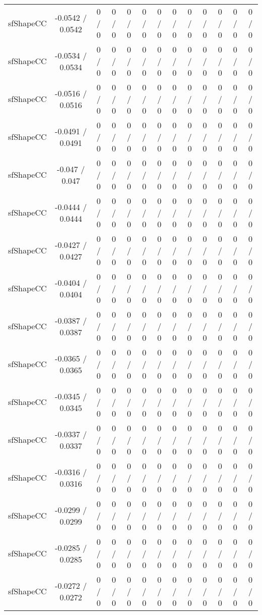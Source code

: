 \documentclass[10pt]{article}
\begin{document}
\begin{table}[htbp]
\begin{center}
\begin{tabular}{|c|c|c|c|c|c|c|c|c|c|c|c|c|}
  sfShapeCC & -0.0542 / 0.0542 & 0 / 0 & 0 / 0 & 0 / 0 & 0 / 0 & 0 / 0 & 0 / 0 & 0 / 0 & 0 / 0 & 0 / 0 & 0 / 0 & 0 / 0 \\ 
  sfShapeCC & -0.0534 / 0.0534 & 0 / 0 & 0 / 0 & 0 / 0 & 0 / 0 & 0 / 0 & 0 / 0 & 0 / 0 & 0 / 0 & 0 / 0 & 0 / 0 & 0 / 0 \\ 
  sfShapeCC & -0.0516 / 0.0516 & 0 / 0 & 0 / 0 & 0 / 0 & 0 / 0 & 0 / 0 & 0 / 0 & 0 / 0 & 0 / 0 & 0 / 0 & 0 / 0 & 0 / 0 \\ 
  sfShapeCC & -0.0491 / 0.0491 & 0 / 0 & 0 / 0 & 0 / 0 & 0 / 0 & 0 / 0 & 0 / 0 & 0 / 0 & 0 / 0 & 0 / 0 & 0 / 0 & 0 / 0 \\ 
  sfShapeCC & -0.047 / 0.047 & 0 / 0 & 0 / 0 & 0 / 0 & 0 / 0 & 0 / 0 & 0 / 0 & 0 / 0 & 0 / 0 & 0 / 0 & 0 / 0 & 0 / 0 \\ 
  sfShapeCC & -0.0444 / 0.0444 & 0 / 0 & 0 / 0 & 0 / 0 & 0 / 0 & 0 / 0 & 0 / 0 & 0 / 0 & 0 / 0 & 0 / 0 & 0 / 0 & 0 / 0 \\ 
  sfShapeCC & -0.0427 / 0.0427 & 0 / 0 & 0 / 0 & 0 / 0 & 0 / 0 & 0 / 0 & 0 / 0 & 0 / 0 & 0 / 0 & 0 / 0 & 0 / 0 & 0 / 0 \\ 
  sfShapeCC & -0.0404 / 0.0404 & 0 / 0 & 0 / 0 & 0 / 0 & 0 / 0 & 0 / 0 & 0 / 0 & 0 / 0 & 0 / 0 & 0 / 0 & 0 / 0 & 0 / 0 \\ 
  sfShapeCC & -0.0387 / 0.0387 & 0 / 0 & 0 / 0 & 0 / 0 & 0 / 0 & 0 / 0 & 0 / 0 & 0 / 0 & 0 / 0 & 0 / 0 & 0 / 0 & 0 / 0 \\ 
  sfShapeCC & -0.0365 / 0.0365 & 0 / 0 & 0 / 0 & 0 / 0 & 0 / 0 & 0 / 0 & 0 / 0 & 0 / 0 & 0 / 0 & 0 / 0 & 0 / 0 & 0 / 0 \\ 
  sfShapeCC & -0.0345 / 0.0345 & 0 / 0 & 0 / 0 & 0 / 0 & 0 / 0 & 0 / 0 & 0 / 0 & 0 / 0 & 0 / 0 & 0 / 0 & 0 / 0 & 0 / 0 \\ 
  sfShapeCC & -0.0337 / 0.0337 & 0 / 0 & 0 / 0 & 0 / 0 & 0 / 0 & 0 / 0 & 0 / 0 & 0 / 0 & 0 / 0 & 0 / 0 & 0 / 0 & 0 / 0 \\ 
  sfShapeCC & -0.0316 / 0.0316 & 0 / 0 & 0 / 0 & 0 / 0 & 0 / 0 & 0 / 0 & 0 / 0 & 0 / 0 & 0 / 0 & 0 / 0 & 0 / 0 & 0 / 0 \\ 
  sfShapeCC & -0.0299 / 0.0299 & 0 / 0 & 0 / 0 & 0 / 0 & 0 / 0 & 0 / 0 & 0 / 0 & 0 / 0 & 0 / 0 & 0 / 0 & 0 / 0 & 0 / 0 \\ 
  sfShapeCC & -0.0285 / 0.0285 & 0 / 0 & 0 / 0 & 0 / 0 & 0 / 0 & 0 / 0 & 0 / 0 & 0 / 0 & 0 / 0 & 0 / 0 & 0 / 0 & 0 / 0 \\ 
  sfShapeCC & -0.0272 / 0.0272 & 0 / 0 & 0 / 0 & 0 / 0 & 0 / 0 & 0 / 0 & 0 / 0 & 0 / 0 & 0 / 0 & 0 / 0 & 0 / 0 & 0 / 0 \\ 

\end{tabular}
\end{center}
\end{table}
\end{document}
